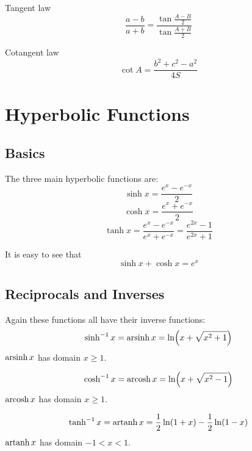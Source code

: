 \begin{thrm}{Tangent law}{}
\begin{equation}
\frac{a-b}{a+b}=\frac{\tan\frac{A-B}{2}}{\tan\frac{A+B}{2}}
\end{equation}
\end{thrm}

\begin{thrm}{Cotangent law}{}
\begin{equation}
\cot A=\frac{b^2+c^2-a^2}{4S}
\end{equation}
\end{thrm}
\pagebreak

\section{Hyperbolic Functions}
\subsection{Basics}
The three main hyperbolic functions are:
\begin{equation}
\sinh x = \frac{e^x-e^{-x}}{2}
\end{equation}
\begin{equation}
\cosh x = \frac{e^x+e^{-x}}{2}
\end{equation}
\begin{equation}
\tanh x = \frac{e^x-e^{-x}}{e^x+e^{-x}} = \frac{e^{2x}-1}{e^{2x}+1}
\end{equation}

It is easy to see that
\[ \sinh x + \cosh x = e^x \]

\subsection{Reciprocals and Inverses}
Again these functions all have their inverse functions:
\begin{equation}
\sinh^{-1} x = \operatorname{arsinh} x = \ln(x+\sqrt{x^2+1})
\end{equation}
$\operatorname{arsinh} x$ has domain $x \ge 1$.

\begin{equation}
\cosh^{-1} x = \operatorname{arcosh} x = \ln(x+\sqrt{x^2-1})
\end{equation}
$\operatorname{arcosh} x$ has domain $x \ge 1$.

\begin{equation}
\tanh^{-1} x = \operatorname{artanh} x = \frac{1}{2}\ln(1+x)-\frac{1}{2}\ln(1-x)
\end{equation}
$\operatorname{artanh} x$ has domain $-1<x<1$.

